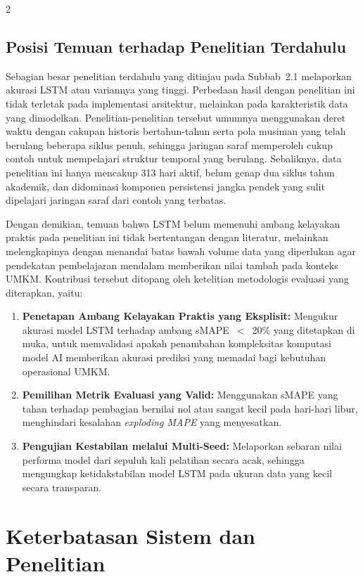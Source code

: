 \documentclass[12pt, a4paper, onecolumn, oneside]{report}
\begin{document}
\begin{spacing}{2}
\subsection{Posisi Temuan terhadap Penelitian Terdahulu}
Sebagian besar penelitian terdahulu yang ditinjau pada Subbab~2.1 melaporkan akurasi LSTM atau variannya yang tinggi. Perbedaan hasil dengan penelitian ini tidak terletak pada implementasi arsitektur, melainkan pada karakteristik data yang dimodelkan. Penelitian-penelitian tersebut umumnya menggunakan deret waktu dengan cakupan historis bertahun-tahun serta pola musiman yang telah berulang beberapa siklus penuh, sehingga jaringan saraf memperoleh cukup contoh untuk mempelajari struktur temporal yang berulang. Sebaliknya, data penelitian ini hanya mencakup 313 hari aktif, belum genap dua siklus tahun akademik, dan didominasi komponen persistensi jangka pendek yang sulit dipelajari jaringan saraf dari contoh yang terbatas.

Dengan demikian, temuan bahwa LSTM belum memenuhi ambang kelayakan praktis pada penelitian ini tidak bertentangan dengan literatur, melainkan melengkapinya dengan menandai batas bawah volume data yang diperlukan agar pendekatan pembelajaran mendalam memberikan nilai tambah pada konteks UMKM. Kontribusi tersebut ditopang oleh ketelitian metodologis evaluasi yang diterapkan, yaitu:
\begin{enumerate}
    \item \textbf{Penetapan Ambang Kelayakan Praktis yang Eksplisit:} Mengukur akurasi model LSTM terhadap ambang sMAPE~$<$~20\% yang ditetapkan di muka, untuk memvalidasi apakah penambahan kompleksitas komputasi model AI memberikan akurasi prediksi yang memadai bagi kebutuhan operasional UMKM.
    \item \textbf{Pemilihan Metrik Evaluasi yang Valid:} Menggunakan sMAPE yang tahan terhadap pembagian bernilai nol atau sangat kecil pada hari-hari libur, menghindari kesalahan \textit{exploding MAPE} yang menyesatkan.
    \item \textbf{Pengujian Kestabilan melalui Multi-Seed:} Melaporkan sebaran nilai performa model dari sepuluh kali pelatihan secara acak, sehingga mengungkap ketidakstabilan model LSTM pada ukuran data yang kecil secara transparan.
\end{enumerate}

\section{Keterbatasan Sistem dan Penelitian}


\end{spacing}
\end{document}
